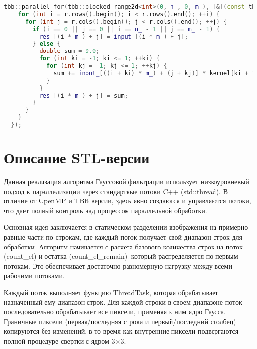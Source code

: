 \documentclass[a4paper,12pt]{article}
\begin{document}
\begin{lstlisting}[language=C++, caption=TBB-реализация]
  tbb::parallel_for(tbb::blocked_range2d<int>(0, n_, 0, m_), [&](const tbb::blocked_range2d<int> &r) {
    for (int i = r.rows().begin(); i < r.rows().end(); ++i) {
      for (int j = r.cols().begin(); j < r.cols().end(); ++j) {
        if (i == 0 || j == 0 || i == n_ - 1 || j == m_ - 1) {
          res_[(i * m_) + j] = input_[(i * m_) + j];
        } else {
          double sum = 0.0;
          for (int ki = -1; ki <= 1; ++ki) {
            for (int kj = -1; kj <= 1; ++kj) {
              sum += input_[((i + ki) * m_) + (j + kj)] * kernel[ki + 1][kj + 1];
            }
          }
          res_[(i * m_) + j] = sum;
        }
      }
    }
  });
\end{lstlisting}

\newpage

\section{Описание STL-версии}

Данная реализация алгоритма Гауссовой фильтрации использует низкоуровневый подход к параллелизации через стандартные потоки C++ (std::thread). В отличие от OpenMP и TBB версий, здесь явно создаются и управляются потоки, что дает полный контроль над процессом параллельной обработки.

Основная идея заключается в статическом разделении изображения на примерно равные части по строкам, где каждый поток получает свой диапазон строк для обработки. Алгоритм начинается с расчета базового количества строк на поток (count\_el) и остатка (count\_el\_remain), который распределяется по первым потокам. Это обеспечивает достаточно равномерную нагрузку между всеми рабочими потоками.

Каждый поток выполняет функцию ThreadTask, которая обрабатывает назначенный ему диапазон строк. Для каждой строки в своем диапазоне поток последовательно обрабатывает все пиксели, применяя к ним ядро Гаусса. Граничные пиксели (первая/последняя строка и первый/последний столбец) копируются без изменений, в то время как внутренние пиксели подвергаются полной процедуре свертки с ядром 3×3.
\end{document}
